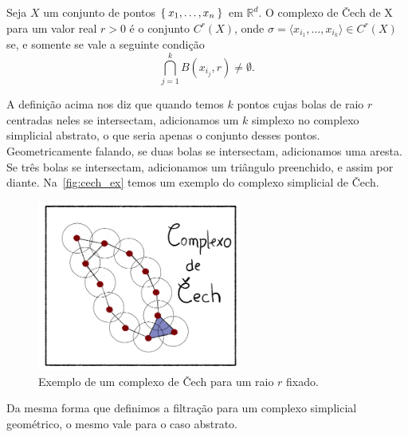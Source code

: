 \begin{defi}
  Seja $X$ um conjunto de pontos $\Set{x_1, \dots, x_n}$ em $\mathbb{R}^d$. O complexo
  de \v{C}ech de X para um valor real $r>0$ é o conjunto $C^r(X)$, onde
  $\sigma = \langle x_{i_1}, \dots, x_{i_k} \rangle \in C^r(X)$ se, e somente se vale a seguinte
  condição
  \begin{equation*}
    \bigcap_{j=1}^k B(x_{i_j},r) \neq \emptyset.
  \end{equation*}
\end{defi}
A definição acima nos diz que quando temos $k$ pontos cujas bolas de raio $r$
centradas neles se intersectam, adicionamos um $k$ simplexo no complexo simplicial
abstrato, o que seria apenas o conjunto desses pontos. Geometricamente falando,
se duas bolas se intersectam, adicionamos uma aresta. Se três bolas se intersectam,
adicionamos um triângulo preenchido, e assim por diante. Na~\autoref{fig:cech_ex}
temos um exemplo do complexo simplicial de \v{C}ech.
\begin{figure}[htb]
  \centering
  \includegraphics[width=0.6\textwidth]{images/ComplexCech.png}
  \caption{Exemplo de um complexo de \v{C}ech para um raio $r$ fixado.}
  \label{fig:cech_ex}
  \fautor
\end{figure}

Da mesma forma que definimos a filtração para um complexo simplicial geométrico,
o mesmo vale para o caso abstrato.

